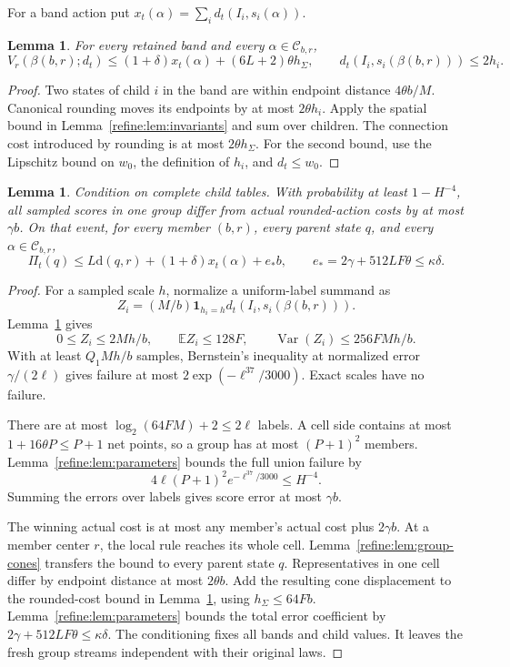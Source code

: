 \documentclass[11pt]{article}
\newtheorem{lemma}[theorem]{Lemma}
\theoremstyle{definition}
\newcommand{\E}{\mathbb E}
\newcommand{\dd}{\mathrm d}
\newcommand{\cC}{\mathcal C}
\newcommand{\1}{\mathbf 1}
\begin{document}
For a band action put $x_t(\alpha)=\sum_i d_t(I_i,s_i(\alpha))$.

\begin{lemma}\label{refine:lem:roundedcost}
For every retained band and every $\alpha\in\cC_{b,r}$,
\[
 V_r(\beta(b,r);d_t)
 \le(1+\delta)x_t(\alpha)+(6L+2)\theta h_\Sigma,\qquad
 d_t(I_i,s_i(\beta(b,r)))\le2h_i.
\]
\end{lemma}
\begin{proof}
Two states of child $i$ in the band are within endpoint distance
$4\theta b/M$. Canonical rounding moves its endpoints by at most
$2\theta h_i$. Apply the spatial bound in
Lemma~\ref{refine:lem:invariants} and sum over children.
The connection cost introduced by rounding is at most $2\theta h_\Sigma$.
For the second bound, use the Lipschitz bound on $w_0$, the definition
of $h_i$, and $d_t\le w_0$.
\end{proof}

\begin{lemma}\label{refine:lem:group}
Condition on complete child tables. With probability at least $1-H^{-4}$, all sampled scores in one group differ from actual rounded-action costs by at most $\gamma b$. On that event, for every member $(b,r)$, every parent state $q$, and every $\alpha\in\cC_{b,r}$,
\[
 \Pi_t(q)\le L\dd(q,r)+(1+\delta)x_t(\alpha)+e_*b,
 \qquad e_*=2\gamma+512LF\theta\le\kappa\delta.
\]
\end{lemma}
\begin{proof}
For a sampled scale $h$, normalize a uniform-label summand as
\[
 Z_i=(M/b)\mathbf1_{h_i=h}d_t(I_i,s_i(\beta(b,r))).
\]
Lemma~\ref{refine:lem:roundedcost} gives
\[
 0\le Z_i\le2Mh/b,\qquad \E Z_i\le128F,\qquad
 \operatorname{Var}(Z_i)\le256FMh/b.
\]
With at least $Q_1Mh/b$ samples, Bernstein's inequality at normalized
error $\gamma/(2\ell)$ gives failure at most
$2\exp(-\ell^{37}/3000)$. Exact scales have no failure.

There are at most $\log_2(64FM)+2\le2\ell$ labels.
A cell side contains at most $1+16\theta P\le P+1$ net points, so a
group has at most $(P+1)^2$ members.
Lemma~\ref{refine:lem:parameters} bounds the full union failure by
\[
 4\ell(P+1)^2e^{-\ell^{37}/3000}\le H^{-4}.
\]
Summing the errors over labels gives score error at most $\gamma b$.

The winning actual cost is at most any member's actual cost plus
$2\gamma b$. At a member center $r$, the local rule reaches its whole cell.
Lemma~\ref{refine:lem:group-cones} transfers the bound
to every parent state $q$. Representatives in one cell differ by endpoint
distance at most $2\theta b$.
Add the resulting cone displacement to the rounded-cost bound in
Lemma~\ref{refine:lem:roundedcost}, using $h_\Sigma\le64Fb$.
Lemma~\ref{refine:lem:parameters} bounds the total error coefficient by
$2\gamma+512LF\theta\le\kappa\delta$.
The conditioning fixes all bands and child values. It leaves the fresh
group streams independent with their original laws.
\end{proof}
\end{document}
